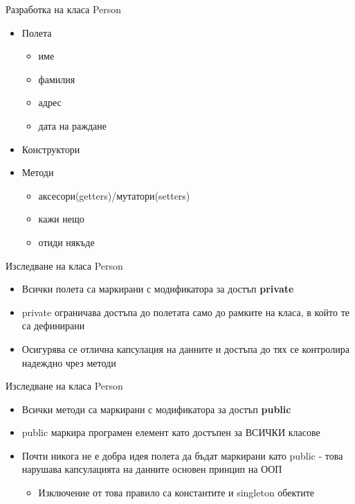 \documentclass{beamer}
\begin{document}
\begin{frame}{Разработка на класа Person}
  \transdissolve
  \begin{itemize}
  \item Полета \pause
    \begin{itemize}
    \item име \pause
    \item фамилия \pause
    \item адрес \pause
    \item дата на раждане \pause
    \end{itemize}
  \item Конструктори \pause
  \item Методи \pause
    \begin{itemize}
    \item аксесори(getters)/мутатори(setters) \pause
    \item кажи нещо \pause
    \item отиди някъде
    \end{itemize}
  \end{itemize}
\end{frame}

\begin{frame}{Изследване на класа Person}
  \transdissolve
  \begin{itemize}
  \item Всички полета са маркирани с
    модификатора за достъп \textbf{private} \pause
  \item private ограничава достъпа до полетата
    само до рамките на класа, в който те са
    дефинирани \pause
  \item Осигурява се отлична капсулация на
    данните и достъпа до тях се контролира
    надеждно чрез методи
  \end{itemize}
\end{frame}

\begin{frame}{Изследване на класа Person}
  \transdissolve
  \begin{itemize}
  \item Всички методи са маркирани с
    модификатора за достъп \textbf{public} \pause
  \item public маркира програмен елемент като
    достъпен за ВСИЧКИ класове \pause
  \item Почти никога не е добра идея полета да
    бъдат маркирани като public - това
    нарушава капсулацията на данните
    основен принцип на ООП
    \begin{itemize}
      \item Изключение от това правило са константите и singleton обектите
    \end{itemize}
  \end{itemize}
\end{frame}
\end{document}
